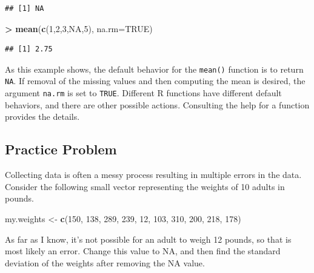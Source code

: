 \documentclass[
]{krantz}
\newenvironment{Shaded}{\begin{snugshade}}{\end{snugshade}}
\newcommand{\DataTypeTok}[1]{\textcolor[rgb]{0.13,0.29,0.53}{#1}}
\newcommand{\DecValTok}[1]{\textcolor[rgb]{0.00,0.00,0.81}{#1}}
\newcommand{\KeywordTok}[1]{\textcolor[rgb]{0.13,0.29,0.53}{\textbf{#1}}}
\newcommand{\NormalTok}[1]{#1}
\newcommand{\OperatorTok}[1]{\textcolor[rgb]{0.81,0.36,0.00}{\textbf{#1}}}
\newcommand{\OtherTok}[1]{\textcolor[rgb]{0.56,0.35,0.01}{#1}}
\newcommand{\StringTok}[1]{\textcolor[rgb]{0.31,0.60,0.02}{#1}}
\begin{document}
\begin{verbatim}
## [1] NA
\end{verbatim}

\begin{Shaded}
\begin{Highlighting}[]
\OperatorTok{\textgreater{}}\StringTok{ }\KeywordTok{mean}\NormalTok{(}\KeywordTok{c}\NormalTok{(}\DecValTok{1}\NormalTok{,}\DecValTok{2}\NormalTok{,}\DecValTok{3}\NormalTok{,}\OtherTok{NA}\NormalTok{,}\DecValTok{5}\NormalTok{), }\DataTypeTok{na.rm=}\OtherTok{TRUE}\NormalTok{)}
\end{Highlighting}
\end{Shaded}

\begin{verbatim}
## [1] 2.75
\end{verbatim}

As this example shows, the default behavior for the \texttt{mean()} function is to return \texttt{NA}. If removal of the missing values and then computing the mean is desired, the argument \texttt{na.rm} is set to \texttt{TRUE}. Different R functions have different default behaviors, and there are other possible actions. Consulting the help for a function provides the details.

\hypertarget{ch4PP2}{%
\subsection{Practice Problem}\label{ch4PP2}}

Collecting data is often a messy process resulting in multiple errors in the data. Consider the following small vector representing the weights of 10 adults in pounds.

\begin{Shaded}
\begin{Highlighting}[]
\NormalTok{my.weights \textless{}{-}}\StringTok{ }\KeywordTok{c}\NormalTok{(}\DecValTok{150}\NormalTok{, }\DecValTok{138}\NormalTok{, }\DecValTok{289}\NormalTok{, }\DecValTok{239}\NormalTok{, }\DecValTok{12}\NormalTok{, }\DecValTok{103}\NormalTok{, }\DecValTok{310}\NormalTok{, }\DecValTok{200}\NormalTok{, }\DecValTok{218}\NormalTok{, }\DecValTok{178}\NormalTok{)}
\end{Highlighting}
\end{Shaded}

As far as I know, it's not possible for an adult to weigh 12 pounds, so that is most likely an error. Change this value to NA, and then find the standard deviation of the weights after removing the NA value.
\end{document}

